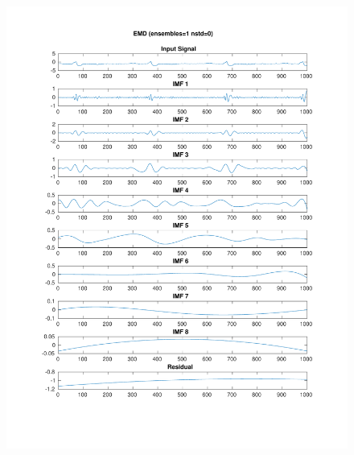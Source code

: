 \documentclass[11pt,a4paper]{article}
\begin{document}
\begin{figure}[H]
\centering
\begin{minipage}{0.48\textwidth}
	\centering
	\includegraphics[width=\textwidth]{fig/118l1_emd.pdf}
	

\end{minipage}
\end{figure}
\end{document}
